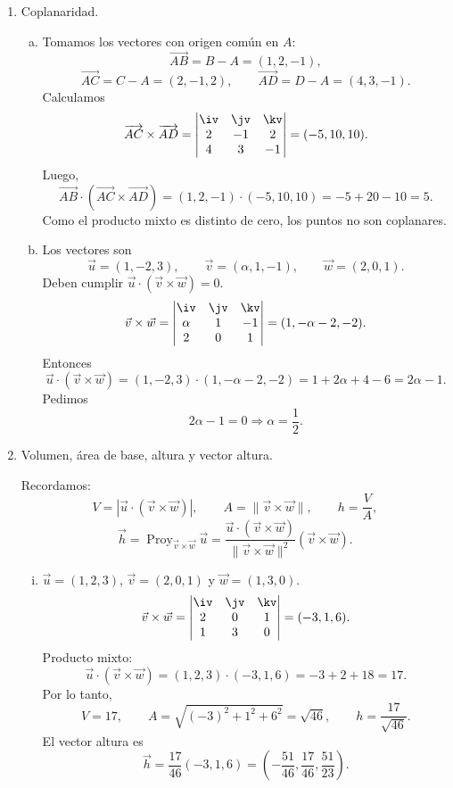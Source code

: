 \begin{enumerate}[\hspace{-3mm}$1)$]
\item Coplanaridad.
\begin{sol}
\begin{enumerate}[a)]
\item Tomamos los vectores con origen común en $A$:
\[
\overrightarrow{AB}=B-A=(1,2,-1),
\]
\[
\overrightarrow{AC}=C-A=(2,-1,2),
\qquad
\overrightarrow{AD}=D-A=(4,3,-1).
\]
Calculamos
\[
\overrightarrow{AC}\times\overrightarrow{AD}=
\begin{vmatrix}
\iv&\jv&\kv\\
2&-1&2\\
4&3&-1
\end{vmatrix}=(-5,10,10).
\]
Luego,
\[
\overrightarrow{AB}\cdot(\overrightarrow{AC}\times\overrightarrow{AD})=(1,2,-1)\cdot(-5,10,10)=-5+20-10=5.
\]
Como el producto mixto es distinto de cero, los puntos no son coplanares.
\item Los vectores son
\[
\vec u=(1,-2,3),\qquad \vec v=(\alpha,1,-1),\qquad \vec w=(2,0,1).
\]
Deben cumplir $\vec u\cdot(\vec v\times\vec w)=0$.
\[
\vec v\times\vec w=
\begin{vmatrix}
\iv&\jv&\kv\\
\alpha&1&-1\\
2&0&1
\end{vmatrix}=(1,-\alpha-2,-2).
\]
Entonces
\[
\vec u\cdot(\vec v\times\vec w)=(1,-2,3)\cdot(1,-\alpha-2,-2)=1+2\alpha+4-6=2\alpha-1.
\]
Pedimos
\[
2\alpha-1=0\Rightarrow \boxed{\alpha=\frac12}.
\]
\end{enumerate}
\end{sol}

\item Volumen, área de base, altura y vector altura.
\begin{sol}
Recordamos:
\[
V=|\vec u\cdot(\vec v\times\vec w)|,
\qquad
A=\|\vec v\times\vec w\|,
\qquad
h=\frac{V}{A},
\]
\[
\vec h=\operatorname{Proy}_{\vec v\times\vec w}\vec u
=\frac{\vec u\cdot(\vec v\times\vec w)}{\|\vec v\times\vec w\|^2}(\vec v\times\vec w).
\]

\begin{enumerate}[i)]
\item $\vec u=(1,2,3)$, $\vec v=(2,0,1)$ y $\vec w=(1,3,0)$.
\[
\vec v\times\vec w=
\begin{vmatrix}
\iv&\jv&\kv\\
2&0&1\\
1&3&0
\end{vmatrix}=(-3,1,6).
\]
Producto mixto:
\[
\vec u\cdot(\vec v\times\vec w)=(1,2,3)\cdot(-3,1,6)=-3+2+18=17.
\]
Por lo tanto,
\[
V=17,\qquad A=\sqrt{(-3)^2+1^2+6^2}=\sqrt{46},\qquad h=\frac{17}{\sqrt{46}}.
\]
El vector altura es
\[
\vec h=\frac{17}{46}(-3,1,6)=\left(-\frac{51}{46},\frac{17}{46},\frac{51}{23}\right).
\]


\end{enumerate}
\end{sol}
\end{enumerate}
